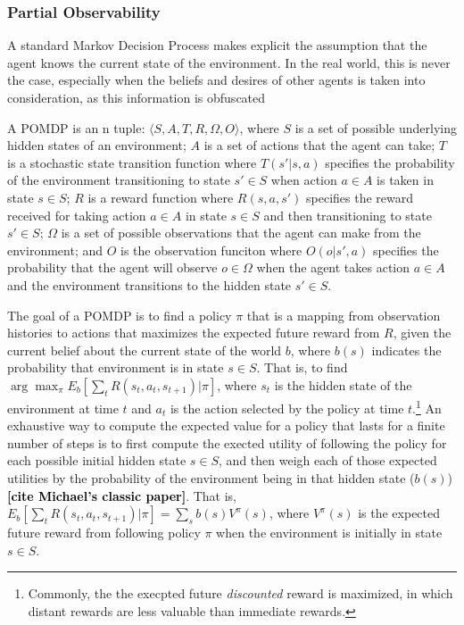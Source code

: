 \documentclass[11pt]{article}
\newcommand\ncitea[1]{\textcolor{black}{{\bf [cite #1]}}}
\begin{document}
\subsubsection{Partial Observability}

A standard Markov Decision Process makes explicit the assumption that the agent knows the current state of the environment. In the real world, this is never the case, especially when the beliefs and desires of other agents is taken into consideration, as this information is obfuscated

A POMDP is an n tuple: $\langle S,A,T,R,\Omega,O \rangle$, where $S$ is a set of possible underlying hidden states of an environment; $A$ is a set of actions that the agent can take; $T$ is a stochastic state transition function where $T(s' | s, a)$ specifies the probability of the environment transitioning to state $s' \in S$ when action $a \in A$ is taken in state $s \in S$; $R$ is a reward function where $R(s, a, s')$ specifies the reward received for taking action $a \in A$ in state $s \in S$ and then transitioning to state $s' \in S$; $\Omega$ is a set of possible observations that the agent can make from the environment; and $O$ is the observation funciton where $O(o | s', a)$ specifies the probability that the agent will observe $o \in \Omega$ when the agent takes action $a \in A$ and the environment transitions to the hidden state $s' \in S$.

The goal of a POMDP is to find a policy $\pi$ that is a mapping from observation histories to actions that maximizes the expected future reward from $R$, given the current belief about the current state of the world $b$, where $b(s)$ indicates the probability that environment is in state $s \in S$. That is, to find $\arg\max_\pi E_b[\sum_t R(s_t,a_t,s_{t+1}) | \pi]$, where $s_t$ is the hidden state of the environment at time $t$ and $a_t$ is the action selected by the policy at time $t$.\footnote{Commonly, the the execpted future {\em discounted} reward is maximized, in which distant rewards are less valuable than immediate rewards.} An exhaustive way to compute the expected value for a policy that lasts for a finite number of steps is to first compute the exected utility of following the policy for each possible initial hidden state $s \in S$, and then weigh each of those expected utilities by the probability of the environment being in that hidden state ($b(s)$) \ncitea{Michael's classic paper}. That is, $E_b[\sum_t R(s_t,a_t,s_{t+1}) | \pi] = \sum_s b(s) V^\pi(s)$, where $V^\pi(s)$ is the expected future reward from following policy $\pi$ when the environment is initially in state $s \in S$.
\end{document}
